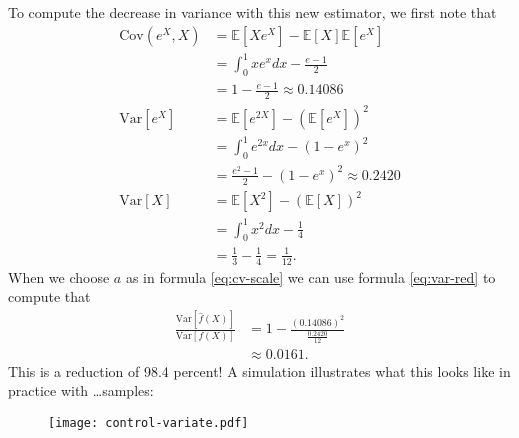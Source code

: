 To compute the decrease in variance with this new estimator, we first note that
\begin{align*}
    \text{Cov}(e^X, X) &= \mathbb{E}[ Xe^X ] - \mathbb{E}[ X ]\mathbb{E}[ e^X ] \\
        &= \int_0^1 xe^x dx - \frac{e-1}{2} \\
        &= 1 - \frac{e-1}{2} \approx 0.14086 \\
    \text{Var}[e^X] &= \mathbb{E}[e^{2X}] - (\mathbb{E}[e^X])^2 \\
        &= \int_0^1 e^{2x} dx - (1 - e^x)^2 \\
        &= \frac{e^2 - 1}{2}  - (1 - e^x)^2 \approx 0.2420 \\
    \text{Var}[X] &= \mathbb{E}[X^2] - (\mathbb{E}[X])^2 \\
        &= \int_0^1 x^2 dx - \frac{1}{4} \\
        &= \frac{1}{3} - \frac{1}{4} = \frac{1}{12}.
\end{align*}
When we choose $a$ as in formula \ref{eq:cv-scale} we can use formula \ref{eq:var-red} to compute that
\begin{align*}
    \frac{\text{Var}[ \hat{f}(X) ]}{\text{Var}[ f(X) ]} &= 1 - \frac{(0.14086)^2}{\frac{0.2420}{12}} \\
        &\approx 0.0161.
\end{align*}
This is a reduction of 98.4 percent! A simulation illustrates what this looks like in practice with \dots samples:
\begin{figure}
  \center
  \texttt{[image: control-variate.pdf]}
\end{figure}
